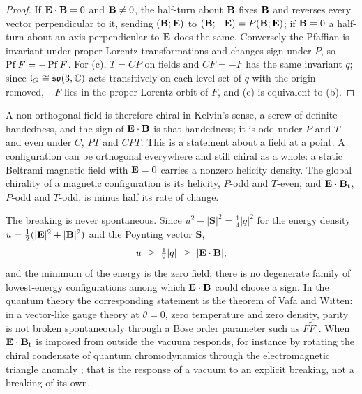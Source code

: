 \begin{proof}
If $\mathbf E\cdot\mathbf B=0$ and $\mathbf B\neq0$, the half-turn about $\mathbf B$ fixes $\mathbf B$ and reverses every vector perpendicular to it, sending $(\mathbf B;\mathbf E)$ to
$(\mathbf B;-\mathbf E)=P(\mathbf B;\mathbf E)$; if $\mathbf B=0$ a half-turn about an axis perpendicular to $\mathbf E$ does the same. Conversely the Pfaffian is invariant
under proper Lorentz transformations and changes sign under $P$, so $\operatorname{Pf} F=-\operatorname{Pf} F$. For (c), $T=CP$ on fields and $CF=-F$ has the same
invariant $q$; since $\mathfrak l_G\cong\mathfrak{so}(3,\mathbb{C})$ acts transitively on each level set of $q$ with the origin removed, $-F$ lies in the proper
Lorentz orbit of $F$, and (c) is equivalent to (b).
\end{proof}

A non-orthogonal field is therefore chiral in Kelvin's sense, a screw of definite handedness, and the sign of $\mathbf E\cdot\mathbf B$ is that
handedness; it is odd under $P$ and $T$ and even under $C$, $PT$ and $CPT$. This is a statement about a field at a point. A configuration
can be orthogonal everywhere and still chiral as a whole: a static Beltrami magnetic field with $\mathbf E=0$ carries a nonzero helicity
density. The global chirality of a magnetic configuration is its helicity, $P$-odd and $T$-even, and $\mathbf E\cdot\mathbf B_{\rm t}$, $P$-odd and
$T$-odd, is minus half its rate of change.

The breaking is never spontaneous. Since $u^2-|\mathbf S|^2=\tfrac14|q|^2$ for the energy density $u=\tfrac12(|\mathbf E|^2+|\mathbf B|^2)$ and the
Poynting vector $\mathbf S$,
\begin{equation}
\label{eq:EBbound}
u\ \ge\ \tfrac12|q|\ \ge\ |\mathbf E\cdot\mathbf B| ,
\end{equation}
and the minimum of the energy is the zero field; there is no degenerate family of lowest-energy configurations among which
$\mathbf E\cdot\mathbf B$ could choose a sign. In the quantum theory the corresponding statement is the theorem of Vafa and Witten: in a vector-like
gauge theory at $\theta=0$, zero temperature and zero density, parity is not broken spontaneously through a Bose order parameter such
as $F\tilde F$ \cite{VafaWitten84}. When $\mathbf E\cdot\mathbf B_{\rm t}$ is imposed from outside the vacuum responds, for instance by rotating the
chiral condensate of quantum chromodynamics through the electromagnetic triangle anomaly \cite{CaoHuang15}; that is the response of a
vacuum to an explicit breaking, not a breaking of its own.

